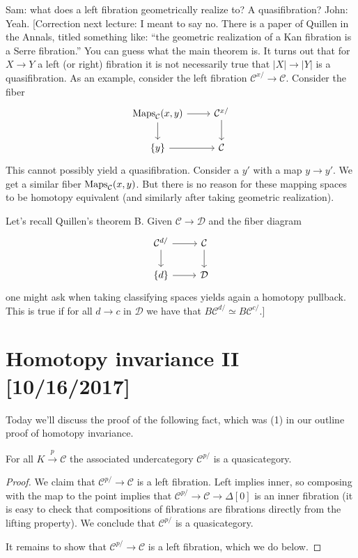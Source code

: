 \documentclass{amsart}
\begin{document}
Sam: what does a left fibration geometrically realize to? A quasifibration? John: Yeah.
[Correction next lecture: I meant to say no. There is a paper of Quillen in the Annals,
    titled something like: ``the geometric realization of a Kan fibration is a Serre fibration.''
    You can guess what the main theorem is. It turns out that for $X\to Y$ a left (or right)
    fibration it is not necessarily true that $|X|\to |Y|$ is a quasifibration. As an
    example, consider the left fibration $\mathcal{C}^{x/}\to\mathcal{C}$. Consider the fiber
    \begin{equation*}
        \begin{tikzcd}
            \Maps_{\mathcal{C}}(x,y) \rar\dar & \mathcal{C}^{x/}\dar \\
            \{y\} \rar & \mathcal{C}
        \end{tikzcd}
    \end{equation*}
    This cannot possibly yield a quasifibration. Consider a $y'$ with a map
    $y\to y'$. We get a similar fiber $\operatorname{Maps}_{\mathcal{C}}(x,y)$.
    But there is no reason for these mapping spaces to be homotopy equivalent
    (and similarly after taking geometric realization).

    Let's recall Quillen's theorem B. Given $\mathcal{C}\to \mathcal{D}$ and
    the fiber diagram
    \begin{equation*}
        \begin{tikzcd}
            \mathcal{C}^{d/} \rar\dar & \mathcal{C}\dar\\
            \{d\} \rar & \mathcal{D}
        \end{tikzcd}
    \end{equation*}
    one might ask when taking classifying spaces yields again a homotopy pullback.
    This is true if for all $d\to c$ in $\mathcal{D}$ we have that $B\mathcal{C}^{d/}\simeq B\mathcal{C}^{c/}$.]

\newpage

\section{Homotopy invariance II [10/16/2017]}

Today we'll discuss the proof of the following fact, which was (1) in our outline proof
of homotopy invariance.
\begin{corollary}[HTT 2.1.2.2]
    For all $K\xrightarrow{p}\mathcal{C}$ the associated undercategory $\mathcal{C}^{p/}$ is a quasicategory.
\end{corollary}
\begin{proof}
    We claim that $\mathcal{C}^{p/}\to \mathcal{C}$ is a left fibration. Left implies inner, so
    composing with the map to the point implies that $\mathcal{C}^{p/}\to \mathcal{C}\to \Delta[0]$
    is an inner fibration (it is easy to check that compositions of fibrations are fibrations directly
    from the lifting property). We conclude that $\mathcal{C}^{p/}$ is a quasicategory.
    
    It remains to show that $\mathcal{C}^{p/}\to \mathcal{C}$ is a left fibration,
    which we do below.
\end{proof}
\end{document}

